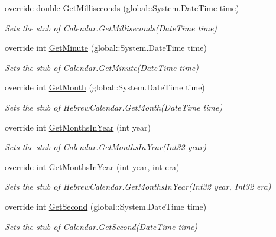 \begin{DoxyCompactItemize}
override double \hyperlink{class_system_1_1_globalization_1_1_fakes_1_1_stub_hebrew_calendar_ae0dd3f8492f045bc0a0fb9b61b25b913}{Get\-Milliseconds} (global\-::\-System.\-Date\-Time time)
\begin{DoxyCompactList}\small\item\em Sets the stub of Calendar.\-Get\-Milliseconds(\-Date\-Time time)\end{DoxyCompactList}\item 
override int \hyperlink{class_system_1_1_globalization_1_1_fakes_1_1_stub_hebrew_calendar_ad000904bd4ec6c1c749b9cb7e0ea2654}{Get\-Minute} (global\-::\-System.\-Date\-Time time)
\begin{DoxyCompactList}\small\item\em Sets the stub of Calendar.\-Get\-Minute(\-Date\-Time time)\end{DoxyCompactList}\item 
override int \hyperlink{class_system_1_1_globalization_1_1_fakes_1_1_stub_hebrew_calendar_a2c0bc1528a3e40240de3348fed0de294}{Get\-Month} (global\-::\-System.\-Date\-Time time)
\begin{DoxyCompactList}\small\item\em Sets the stub of Hebrew\-Calendar.\-Get\-Month(\-Date\-Time time)\end{DoxyCompactList}\item 
override int \hyperlink{class_system_1_1_globalization_1_1_fakes_1_1_stub_hebrew_calendar_afb86dacc02be412e68770792befabf2b}{Get\-Months\-In\-Year} (int year)
\begin{DoxyCompactList}\small\item\em Sets the stub of Calendar.\-Get\-Months\-In\-Year(\-Int32 year)\end{DoxyCompactList}\item 
override int \hyperlink{class_system_1_1_globalization_1_1_fakes_1_1_stub_hebrew_calendar_a00ac57aebead7cf4540cf3f2d0813b8e}{Get\-Months\-In\-Year} (int year, int era)
\begin{DoxyCompactList}\small\item\em Sets the stub of Hebrew\-Calendar.\-Get\-Months\-In\-Year(\-Int32 year, Int32 era)\end{DoxyCompactList}\item 
override int \hyperlink{class_system_1_1_globalization_1_1_fakes_1_1_stub_hebrew_calendar_a769ca4a25f42ec6cc14ac90dd87cb4dd}{Get\-Second} (global\-::\-System.\-Date\-Time time)
\begin{DoxyCompactList}\small\item\em Sets the stub of Calendar.\-Get\-Second(\-Date\-Time time)\end{DoxyCompactList}\item 

\end{DoxyCompactItemize}
